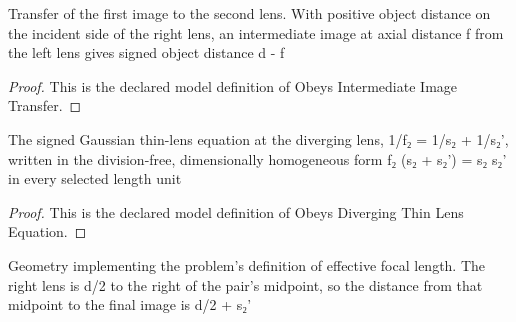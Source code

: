 \begin{definition}
  \label{def:physics:phyx-mini-0078:phyxminiproblems-problemphyxmini0078-obeysintermediateimagetransfer}
  Transfer of the first image to the second lens. With positive object distance on the incident side of the right lens, an intermediate image at axial distance f from the left lens gives signed object distance d - f
\end{definition}
\begin{proof}
  This is the declared model definition of Obeys Intermediate Image Transfer.
\end{proof}
\begin{definition}
  \label{def:physics:phyx-mini-0078:phyxminiproblems-problemphyxmini0078-obeysdivergingthinlensequation}
  The signed Gaussian thin-lens equation at the diverging lens, 1/f₂ = 1/s₂ + 1/s₂', written in the division-free, dimensionally homogeneous form f₂ (s₂ + s₂') = s₂ s₂' in every selected length unit
\end{definition}
\begin{proof}
  This is the declared model definition of Obeys Diverging Thin Lens Equation.
\end{proof}
\begin{definition}
  \label{def:physics:phyx-mini-0078:phyxminiproblems-problemphyxmini0078-obeysmidpointeffectivefocaldefinition}
  Geometry implementing the problem's definition of effective focal length. The right lens is d/2 to the right of the pair's midpoint, so the distance from that midpoint to the final image is d/2 + s₂'
\end{definition}
